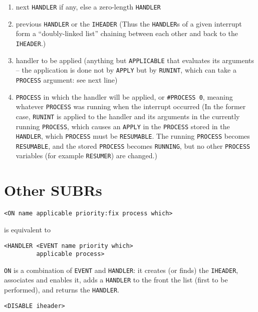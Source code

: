 \documentclass[a4paper]{scrbook}
\providecommand{\tightlist}{%
  \setlength{\itemsep}{0pt}\setlength{\parskip}{0pt}}
\begin{document}
\begin{enumerate}
\def\labelenumi{\arabic{enumi}.}
\tightlist
\item
  next \texttt{HANDLER} if any, else a zero-length \texttt{HANDLER}
\item
  previous \texttt{HANDLER} or the \texttt{IHEADER} (Thus the \texttt{HANDLER}s of a given interrupt form a ``doubly-linked
  list'' chaining between each other and back to the \texttt{IHEADER}.)
\item
  handler to be applied (anything but \texttt{APPLICABLE} that evaluates its arguments -- the application is done not by
  \texttt{APPLY} but by \texttt{RUNINT}, which can take a \texttt{PROCESS} argument: see next
  line)
\item
  \texttt{PROCESS} in which the handler will be applied, or \texttt{\#PROCESS\ 0}, meaning whatever \texttt{PROCESS} was
  running when the interrupt occurred (In the former case, \texttt{RUNINT} is applied to the handler and its arguments in
  the currently running \texttt{PROCESS}, which causes an \texttt{APPLY} in the \texttt{PROCESS} stored in the
  \texttt{HANDLER}, which \texttt{PROCESS} must be \texttt{RESUMABLE}. The running \texttt{PROCESS} becomes
  \texttt{RESUMABLE}, and the stored \texttt{PROCESS} becomes \texttt{RUNNING}, but no other \texttt{PROCESS} variables
  (for example \texttt{RESUMER}) are changed.)
\end{enumerate}

\section{Other SUBRs}\label{other-subrs}

\begin{verbatim}
<ON name applicable priority:fix process which>
\end{verbatim}

 is equivalent to

\begin{verbatim}
<HANDLER <EVENT name priority which>
         applicable process>
\end{verbatim}

\texttt{ON} is a combination of \texttt{EVENT} and \texttt{HANDLER}: it creates (or finds) the \texttt{IHEADER}, associates
and enables it, adds a \texttt{HANDLER} to the front the list (first to be performed), and returns the \texttt{HANDLER}.

\begin{verbatim}
<DISABLE iheader>
\end{verbatim}
\end{document}

